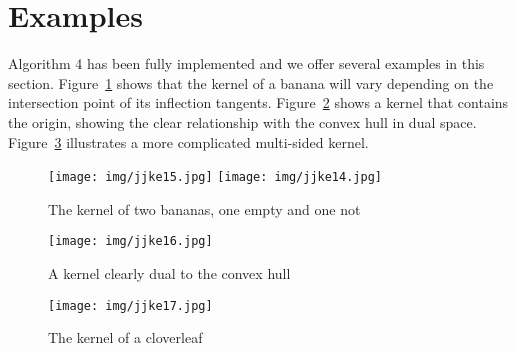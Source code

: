 \documentclass[12pt]{article}
\begin{document}


\section{Examples}
\label{sec:eg}

Algorithm 4 has been fully implemented and we offer 
several examples in this section.
Figure~\ref{fig:banana} shows that 
the kernel of a banana will vary depending on the intersection
point of its inflection tangents.
Figure~\ref{fig:kernelob1a} shows a kernel
that contains the origin, showing the clear relationship with
the convex hull in dual space.
Figure~\ref{fig:complex} illustrates a more complicated multi-sided kernel.

\begin{figure}
\begin{center}
\texttt{[image: img/jjke15.jpg]}
\texttt{[image: img/jjke14.jpg]}
\end{center}
\caption{The kernel of two bananas, one empty and one not}
\label{fig:banana}
\end{figure}

\begin{figure}
\begin{center}
\texttt{[image: img/jjke16.jpg]}
\end{center}
\caption{A kernel clearly dual to the convex hull}
\label{fig:kernelob1a}
\end{figure}

\begin{figure}
\begin{center}
\texttt{[image: img/jjke17.jpg]}
\end{center}
\caption{The kernel of a cloverleaf}
\label{fig:complex}
\end{figure}


\end{document}
